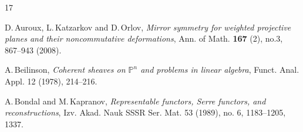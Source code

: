 \documentclass[a4paper,11pt, reqno]{amsart}
\def\P{\mathbb P}
\theoremstyle{plain}
\theoremstyle{definition}
\numberwithin{equation}{section}
\begin{document}
\providecommand{\arxiv}[1]{{\tt{arXiv:#1}}}

\begin{thebibliography}{17}








D.\,Auroux, L.\,Katzarkov and D.\,Orlov, {\it Mirror symmetry for weighted projective planes and their noncommutative deformations}, Ann. of Math. \textbf{167} (2), no.3, 867--943 (2008).


A.\,Beilinson,
{\it Coherent sheaves on $\P^n$ and problems in linear algebra},
 Funct. Anal. Appl. 12 (1978), 214--216.




A.\,Bondal and M.\,Kapranov, {\it Representable functors, Serre functors, and reconstructions}, Izv. Akad. Nauk SSSR Ser. Mat. 53 (1989), no. 6, 1183--1205, 1337.


\end{thebibliography}
\end{document}
